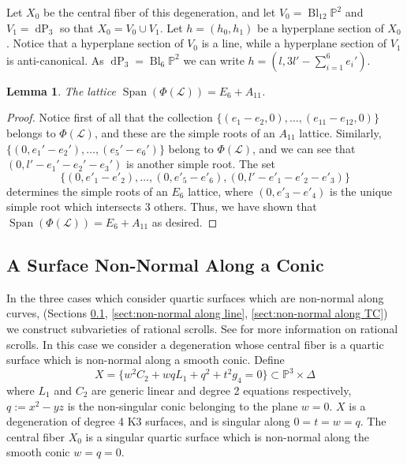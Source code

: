 \documentclass[a4paper]{amsart}
\theoremstyle{definition}
\theoremstyle{plain}
\newtheorem{lemma}[defn]{Lemma}
\theoremstyle{remark}
\newcommand{\PS}{\mathbb{P}}
\begin{document}
Let $X_0$ be the central fiber of this degeneration, and let $V_0 = \operatorname{Bl}_{12}\PS^2$ and $V_1 = \operatorname{dP}_3$ so that $X_0 = V_0 \cup V_1$. Let $h=(h_0,h_1)$ be a hyperplane section of $X_0$. Notice that a hyperplane section of $V_0$ is a line, while a hyperplane section of $V_1$ is anti-canonical. As $\operatorname{dP}_3 = \operatorname{Bl}_6\PS^2$ we can write $h=(l,3l'-\sum_{i=1}^6e_i')$.

\begin{lemma}
The lattice $\operatorname{Span}(\Phi(\mathscr{L})) = E_6+A_{11}$.
\end{lemma}

\begin{proof}
Notice first of all that the collection $\{(e_1-e_2,0),\dots,(e_{11}-e_{12},0) \} $ belongs to $\Phi(\mathscr{L})$, and these are the simple roots of an $A_{11}$ lattice. Similarly, $\{(0,e_{1}'-e_{2}'),\dots,(e_{5}'-e_{6}') \}$ belong to $\Phi(\mathscr{L})$, and we can see that $(0,l'-e_{1}'-e_{2}'-e_{3}')$ is another simple root. The set
$$ \{(0,e'_{1}-e'_{2}),\dots,(0,e'_{5}-e'_{6}), (0,l'-e'_{1}-e'_{2}-e'_{3})\}$$ 
determines the simple roots of an $E_6$ lattice, where $(0,e'_{3}-e'_{4})$ is the unique simple root which intersects 3 others. Thus, we have shown that $\operatorname{Span}(\Phi(\mathscr{L}))=E_6+A_{11}$ as desired.    
\end{proof}

\subsection{A Surface Non-Normal Along a Conic}\label{sect:non-normal along conic}
In the three cases which consider quartic surfaces which are non-normal along curves, (Sections \ref{sect:non-normal along conic}, \ref{sect:non-normal along line}, \ref{sect:non-normal along TC}) we construct subvarieties of rational scrolls. See \cite{Reid96} for more information on rational scrolls. In this case we consider a degeneration whose central fiber is a quartic surface which is non-normal along a smooth conic. Define 
$$ X = \{w^2C_2+wqL_1+q^2+t^2g_4=0\} \subset \mathbb{P}^3 \times \Delta$$
where $L_1$ and $C_2$ are generic linear and degree 2 equations respectively, $q:=x^2-yz$ is the non-singular conic belonging to the plane $w=0$. $X$ is a degeneration of degree 4 K3 surfaces, and is singular along $0=t=w=q$. The central fiber $X_0$ is a singular quartic surface which is non-normal along the smooth conic $w=q=0$.
\end{document}

